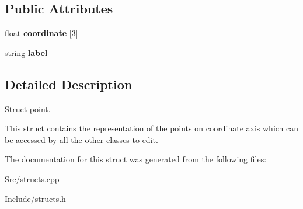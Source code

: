 \subsection*{Public Attributes}
\begin{DoxyCompactItemize}
\item 
float {\bfseries coordinate} \mbox{[}3\mbox{]}\hypertarget{structpoint_a460acc9b7224d448646838f2c92a42b4}{}\label{structpoint_a460acc9b7224d448646838f2c92a42b4}

\item 
string {\bfseries label}\hypertarget{structpoint_aac98b52176e98d5ae6ab04ff1351fb14}{}\label{structpoint_aac98b52176e98d5ae6ab04ff1351fb14}

\end{DoxyCompactItemize}


\subsection{Detailed Description}
Struct point. 

This struct contains the representation of the points on coordinate axis which can be accessed by all the other classes to edit. 

The documentation for this struct was generated from the following files\+:\begin{DoxyCompactItemize}
\item 
Src/\hyperlink{structs_8cpp}{structs.\+cpp}\item 
Include/\hyperlink{structs_8h}{structs.\+h}\end{DoxyCompactItemize}
